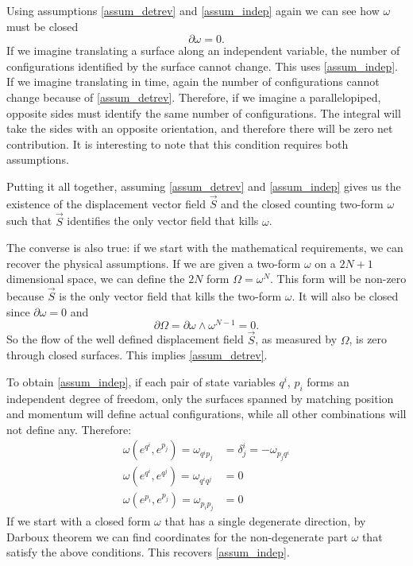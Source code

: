 \documentclass[10pt,twocolumn, nofootinbib]{revtex4-2}
\begin{document}
Using assumptions \ref{assum_detrev} and \ref{assum_indep} again we can see how $\omega$ must be closed
\begin{equation}
	\partial \omega = 0.
\end{equation}
If we imagine translating a surface along an independent variable, the number of configurations identified by the surface cannot change. This uses \ref{assum_indep}. If we imagine translating in time, again the number of configurations cannot change because of \ref{assum_detrev}. Therefore, if we imagine a parallelopiped, opposite sides must identify the same number of configurations. The integral will take the sides with an opposite orientation, and therefore there will be zero net contribution. It is interesting to note that this condition requires both assumptions.

Putting it all together, assuming \ref{assum_detrev} and \ref{assum_indep} gives us the existence of the displacement vector field $\vec{S}$ and the closed counting two-form $\omega$ such that $\vec{S}$ identifies the only vector field that kills $\omega$.

The converse is also true: if we start with the mathematical requirements, we can recover the physical assumptions. If we are given a two-form $\omega$ on a $2N+1$ dimensional space, we can define the $2N$ form $\Omega = \omega^N$. This form will be non-zero because $\vec{S}$ is the only vector field that kills the two-form $\omega$. It will also be closed since $\partial \omega = 0$ and
\begin{equation}
	\partial \Omega = \partial \omega \wedge \omega^{N-1} = 0.
\end{equation}
So the flow of the well defined displacement field $\vec{S}$, as measured by $\Omega$, is zero through closed surfaces. This implies \ref{assum_detrev}.

To obtain \ref{assum_indep}, if each pair of state variables $q^i$, $p_i$ forms an independent degree of freedom, only the surfaces spanned by matching position and momentum will define actual configurations, while all other combinations will not define any. Therefore:
\begin{equation}\label{canonical_conditions}
	\begin{aligned}
		\omega(e^{q^i}, e^{p_j}) = \omega_{q^i p_j} &= \delta^i_j = - \omega_{p_j q^i} \\
		\omega(e^{q^i}, e^{q^j}) = \omega_{q^i q^j} &= 0 \\
		\omega(e^{p_i}, e^{p_j}) = \omega_{p_i p_j} &= 0
	\end{aligned}
\end{equation}
If we start with a closed form $\omega$ that has a single degenerate direction, by Darboux theorem we can find coordinates for the non-degenerate part $\omega$ that satisfy the above conditions. This recovers \ref{assum_indep}.
\end{document}
